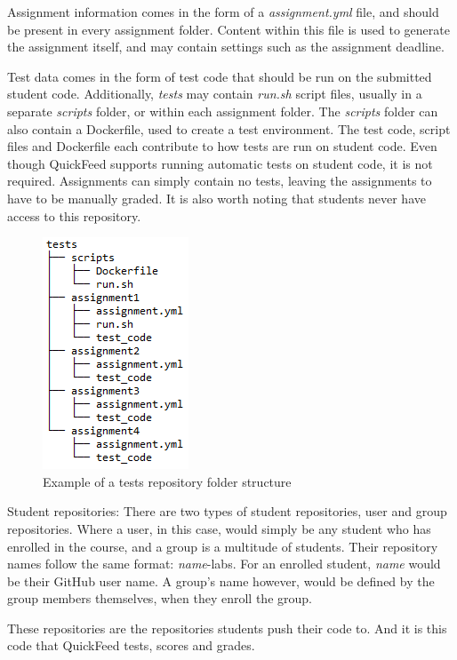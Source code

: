 Assignment information comes in the form of a \textit{assignment.yml} file, and should be present in every assignment folder.
Content within this file is used to generate the assignment itself, and may contain settings such as the assignment deadline.

Test data comes in the form of test code that should be run on the submitted student code.
Additionally, \textit{tests} may contain \textit{run.sh} script files, usually in a separate \textit{scripts} folder, or within each assignment folder.
The \textit{scripts} folder can also contain a Dockerfile, used to create a test environment.
The test code, script files and Dockerfile each contribute to how tests are run on student code.
Even though QuickFeed supports running automatic tests on student code, it is not required.
Assignments can simply contain no tests, leaving the assignments to have to be manually graded.
It is also worth noting that students never have access to this repository.


\begin{figure}[ht]
    \centering
    \includegraphics[scale=0.8]{photos/tests-repository-structure.PNG}
    \caption{Example of a tests repository folder structure}
    \label{fig:tests-repository-structure}
\end{figure}

Student repositories: There are two types of student repositories, user and group repositories.
Where a user, in this case, would simply be any student who has enrolled in the course, and a group is a multitude of students.
Their repository names follow the same format: \textit{name}-labs.
For an enrolled student, \textit{name} would be their GitHub user name.
A group's name however, would be defined by the group members themselves, when they enroll the group.

These repositories are the repositories students push their code to.
And it is this code that QuickFeed tests, scores and grades.


